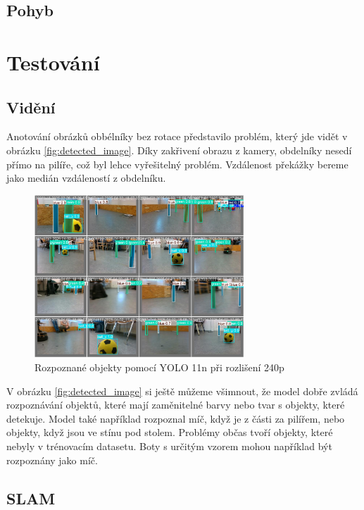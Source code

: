 \documentclass[a4paper,12pt]{article}
\begin{document}
\subsection{Pohyb}

\section{Testování}
\subsection{Vidění}
Anotování obrázků obbélníky bez rotace představilo problém, který jde vidět v obrázku \eqref{fig:detected_image}. Díky zakřivení obrazu z kamery, obdelníky nesedí přímo na pilíře, což byl lehce vyřešitelný problém. Vzdálenost překážky bereme jako medián vzdáleností z obdelníku.
\begin{figure}[H]
    \centering
    \includegraphics[width=0.7\textwidth]{pictures/rozpoznane.jpg}
    \caption{Rozpoznané objekty pomocí YOLO 11n při rozlišení 240p}
    \label{fig:detected_image}
\end{figure}

V obrázku \eqref{fig:detected_image} si ještě můžeme všimnout, že model dobře zvládá rozpoznávání objektů, které mají zaměnitelné barvy nebo tvar s objekty, které detekuje.
Model také například rozpoznal míč, když je z části za pilířem, nebo objekty, když jsou ve stínu pod stolem. Problémy občas tvoří objekty, které nebyly v trénovacím datasetu.
Boty s určitým vzorem mohou například být rozpoznány jako míč.

\subsection{SLAM}
\end{document}
